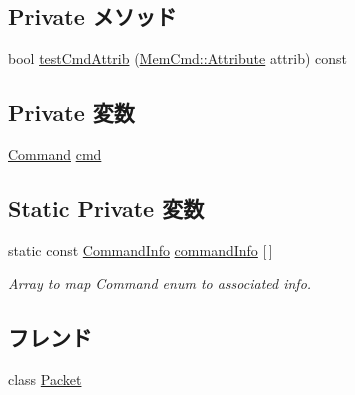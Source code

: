 \subsection*{Private メソッド}
\begin{DoxyCompactItemize}
\item 
bool \hyperlink{classMemCmd_a7327ca4863d15af6e2f7da7d910bb4e9}{testCmdAttrib} (\hyperlink{classMemCmd_a15b1b83081915ae5239f81050ae0f550}{MemCmd::Attribute} attrib) const 
\end{DoxyCompactItemize}
\subsection*{Private 変数}
\begin{DoxyCompactItemize}
\item 
\hyperlink{classMemCmd_a2afce0a47a93eee73a314d53e4890153}{Command} \hyperlink{classMemCmd_a5870707029cae65976d5de2312937cd5}{cmd}
\end{DoxyCompactItemize}
\subsection*{Static Private 変数}
\begin{DoxyCompactItemize}
\item 
static const \hyperlink{structMemCmd_1_1CommandInfo}{CommandInfo} \hyperlink{classMemCmd_a258885ef0e0288230122d2523dc46446}{commandInfo} \mbox{[}$\,$\mbox{]}
\begin{DoxyCompactList}\small\item\em Array to map Command enum to associated info. \item\end{DoxyCompactList}\end{DoxyCompactItemize}
\subsection*{フレンド}
\begin{DoxyCompactItemize}
\item 
class \hyperlink{classMemCmd_ae51cb555166657e5996a76768db998e3}{Packet}
\end{DoxyCompactItemize}


